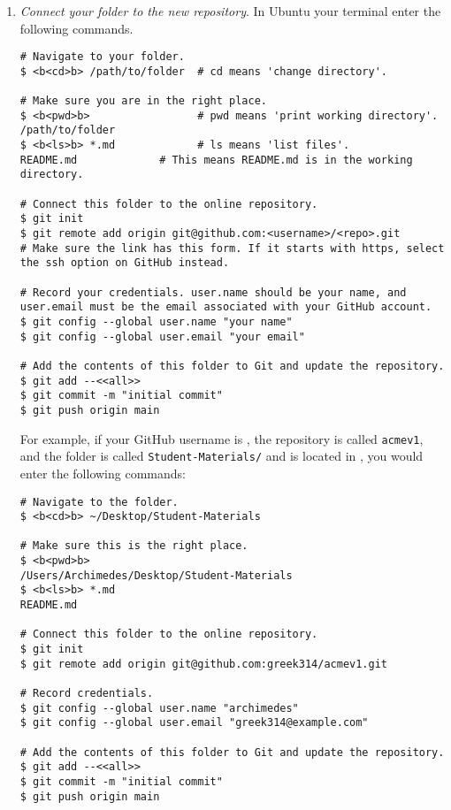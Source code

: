 \begin{enumerate}
    \item \emph{Connect your folder to the new repository}.
    \label{step:connect-folder}
    In 
    \ifwindows
    Ubuntu
    \else
    your terminal
    \fi 
    enter the following commands.
\begin{lstlisting}
# Navigate to your folder.
$ <b<cd>b> /path/to/folder  # cd means 'change directory'.

# Make sure you are in the right place.
$ <b<pwd>b>                 # pwd means 'print working directory'.
/path/to/folder
$ <b<ls>b> *.md             # ls means 'list files'.
README.md             # This means README.md is in the working directory.

# Connect this folder to the online repository.
$ git init
$ git remote add origin git@github.com:<username>/<repo>.git
# Make sure the link has this form. If it starts with https, select the ssh option on GitHub instead.

# Record your credentials. user.name should be your name, and user.email must be the email associated with your GitHub account.
$ git config --global user.name "your name"
$ git config --global user.email "your email"

# Add the contents of this folder to Git and update the repository.
$ git add --<<all>>
$ git commit -m "initial commit"
$ git push origin main
\end{lstlisting}
    
    For example, if your GitHub username is , the repository is called \texttt{acmev1}, and the folder is called \texttt{Student-Materials/} and is located in , you would enter the following commands:
\begin{lstlisting}
# Navigate to the folder.
$ <b<cd>b> ~/Desktop/Student-Materials

# Make sure this is the right place.
$ <b<pwd>b>
/Users/Archimedes/Desktop/Student-Materials
$ <b<ls>b> *.md
README.md

# Connect this folder to the online repository.
$ git init
$ git remote add origin git@github.com:greek314/acmev1.git

# Record credentials.
$ git config --global user.name "archimedes"
$ git config --global user.email "greek314@example.com"

# Add the contents of this folder to Git and update the repository.
$ git add --<<all>>
$ git commit -m "initial commit"
$ git push origin main
\end{lstlisting}
    

\end{enumerate}
